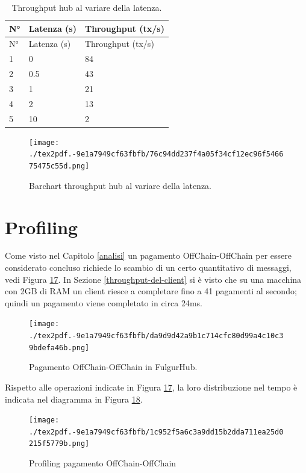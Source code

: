 \documentclass[12pt,italian,]{book}
\begin{document}
\begin{longtable}[]{@{}lll@{}}
\caption{\protect\hypertarget{hub-latenza-table}{}{}Throughput hub al variare della latenza.}\tabularnewline
\toprule
N° & Latenza (s) & Throughput (tx/s)\tabularnewline
\midrule
\endfirsthead
\toprule
N° & Latenza (s) & Throughput (tx/s)\tabularnewline
\midrule
\endhead
1 & 0 & 84\tabularnewline
2 & 0.5 & 43\tabularnewline
3 & 1 & 21\tabularnewline
4 & 2 & 13\tabularnewline
5 & 10 & 2\tabularnewline
\bottomrule
\end{longtable}

\begin{figure}
\centering
\texttt{[image: ./tex2pdf.-9e1a7949cf63fbfb/76c94dd237f4a05f34cf12ec96f546675475c55d.png]}
\caption{\protect\hypertarget{hub-latenza-chart}{}{}Barchart throughput hub al variare della latenza.}
\end{figure}

\hypertarget{profiling}{%
\section{Profiling}\label{profiling}}

Come visto nel Capitolo \ref{analisi} un pagamento OffChain-OffChain per essere considerato concluso richiede lo scambio di un certo quantitativo di messaggi, vedi Figura \protect\hyperlink{profiling-messaggi-offchain}{17}. In Sezione \ref{throughput-del-client} si è visto che su una macchina con 2GB di RAM un client riesce a completare fino a 41 pagamenti al secondo; quindi un pagamento viene completato in circa 24ms.

\begin{figure}
\centering
\texttt{[image: ./tex2pdf.-9e1a7949cf63fbfb/da9d9d42a9b1c714cfc80d99a4c10c39bdefa46b.png]}
\caption{\protect\hypertarget{profiling-messaggi-offchain}{}{}Pagamento OffChain-OffChain in FulgurHub.}
\end{figure}

Rispetto alle operazioni indicate in Figura \protect\hyperlink{profiling-messaggi-offchain}{17}, la loro distribuzione nel tempo è indicata nel diagramma in Figura \protect\hyperlink{profiling-offchain}{18}.

\begin{figure}
\centering
\texttt{[image: ./tex2pdf.-9e1a7949cf63fbfb/1c952f5a6c3a9dd15b2dda711ea25d0215f5779b.png]}
\caption{\protect\hypertarget{profiling-offchain}{}{}Profiling pagamento OffChain-OffChain}
\end{figure}
\end{document}
